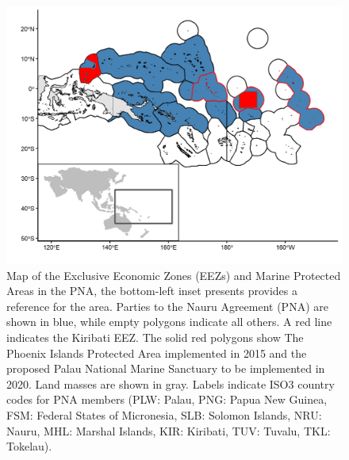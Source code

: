 \documentclass[12pt]{article}
\begin{document}
\begin{figure}
\centering
\includegraphics{img/PNA_map.png}
\caption{\label{fig:PNA_map}Map of the Exclusive Economic Zones (EEZs) and Marine Protected Areas in the PNA, the bottom-left inset presents provides a reference for the area. Parties to the Nauru Agreement (PNA) are shown in blue, while empty polygons indicate all others. A red line indicates the Kiribati EEZ. The solid red polygons show The Phoenix Islands Protected Area implemented in 2015 and the proposed Palau National Marine Sanctuary to be implemented in 2020. Land masses are shown in gray. Labels indicate ISO3 country codes for PNA members (PLW: Palau, PNG: Papua New Guinea, FSM: Federal States of Micronesia, SLB: Solomon Islands, NRU: Nauru, MHL: Marshal Islands, KIR: Kiribati, TUV: Tuvalu, TKL: Tokelau).}
\end{figure}
\end{document}
